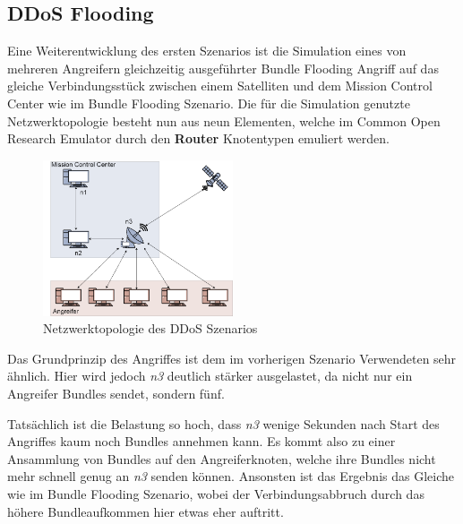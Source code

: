 \documentclass{article}
\begin{document}
\subsection{DDoS Flooding}
Eine Weiterentwicklung des ersten Szenarios ist die Simulation eines von mehreren Angreifern gleichzeitig ausgeführter Bundle Flooding Angriff auf das gleiche Verbindungsstück zwischen einem Satelliten und dem Mission Control Center wie im Bundle Flooding Szenario. Die für die Simulation genutzte Netzwerktopologie besteht nun aus neun Elementen, welche im Common Open Research Emulator durch den \textbf{Router} Knotentypen emuliert werden.\par
\begin{figure}[h]
\centering
\includegraphics[width=0.5\textwidth]{ddos}
\caption{Netzwerktopologie des DDoS Szenarios}
\end{figure}
Das Grundprinzip des Angriffes ist dem im vorherigen Szenario Verwendeten sehr ähnlich. Hier wird jedoch \textit{n3} deutlich stärker ausgelastet, da nicht nur ein Angreifer Bundles sendet, sondern fünf. \par
Tatsächlich ist die Belastung so hoch, dass \textit{n3} wenige Sekunden nach Start des Angriffes kaum noch Bundles annehmen kann. Es kommt also zu einer Ansammlung von Bundles auf den Angreiferknoten, welche ihre Bundles nicht mehr schnell genug an \textit{n3} senden können. Ansonsten ist das Ergebnis das Gleiche wie im Bundle Flooding Szenario, wobei der Verbindungsabbruch durch das höhere Bundleaufkommen  hier etwas eher auftritt.
\end{document}
